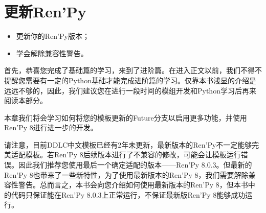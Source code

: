 \chapter{更新Ren'Py}

\begin{ChapterGoals}
    \begin{itemize}
        \item 更新你的Ren'Py版本；
        \item 学会解除兼容性警告。
    \end{itemize}
\end{ChapterGoals}

首先，恭喜您完成了基础篇的学习，来到了进阶篇。在进入正文以前，我们不得不提醒您需要有一定的Python基础才能完成进阶篇的学习。仅靠本书浅显的介绍是远远不够的，因此，我们建议您在进行一段时间的模组开发和Python学习后再来阅读本部分。

本章我们将会学习如何将您的模板更新的Future分支以启用更多功能，并使用Ren'Py 8进行进一步的开发。

\begin{Warning}
    请注意，目前DDLC中文模板已经有2年未更新，最新版本的Ren'Py不一定能够完美适配模板。若Ren'Py 8后续版本进行了不兼容的修改，可能会让模板运行错误。因此我们推荐您使用最后一个确定适配的版本——Ren'Py 8.0.3。但最新的Ren'Py 8也带来了一些新特性，为了使用最新版本的Ren'Py 8，我们需要解除兼容性警告。总而言之，本书会向您介绍如何使用最新版本的Ren'Py 8，但本书中的代码只保证能在Ren'Py 8.0.3上正常运行，不保证最新版Ren'Py 8能够成功运行。
\end{Warning}

